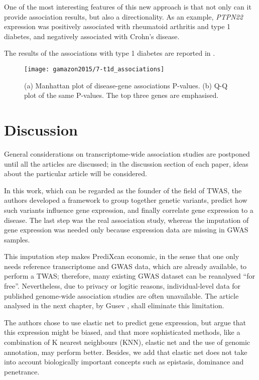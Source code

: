 \documentclass[../main.tex]{subfiles}
\begin{document}
One of the most interesting features of this new approach is that not 
only can it provide association results, but also a directionality. As 
an example, \textit{PTPN22} expression was positively associated with 
rheumatoid arthritis and type 1 diabetes, and negatively associated with 
Crohn's disease.

The results of the associations with type 1 diabetes are reported in 
.

\begin{figure}
	\centering
	\texttt{[image: gamazon2015/7-t1d\_associations]}
	\caption{(a) Manhattan plot of disease-gene associations P-values. 
(b) Q-Q plot of the same P-values. The top three genes are emphasised.}
\end{figure}

\section{Discussion}

General considerations on transcriptome-wide association studies are 
postponed until all the articles are discussed; in the discussion 
section of each paper, ideas about the particular article will be 
considered.

In this work, which can be regarded as the founder of the field of TWAS, 
the authors developed a framework to group together genetic variants, 
predict how such variants influence gene expression, and finally 
correlate gene expression to a disease. The last step was the real 
association study, whereas the imputation of gene expression was needed 
only because expression data are missing in GWAS samples.

This imputation step makes PrediXcan economic, in the sense that one 
only needs reference transcriptome and GWAS data, which are already 
available, to perform a TWAS; therefore, many existing GWAS dataset can 
be reanalysed \enquote{for free}. Nevertheless, due to privacy or 
logitic reasons, individual-level data for published genome-wide association 
studies are often unavailable. The article analysed in the next chapter, 
by Gusev \etal, shall eliminate this limitation.

The authors chose to use elastic net to predict gene expression, but 
argue that this expression might be biased, and that more sophisticated 
methods, like a combination of K nearest neighbours (KNN), elastic net 
and the use of genomic annotation, may perform better. Besides, we add 
that elastic net does not take into account biologically important 
concepts such as epistasis, dominance and penetrance.
\end{document}
